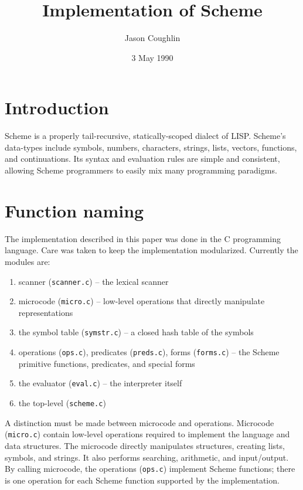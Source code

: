 
\title{Implementation of Scheme}

\author{Jason Coughlin}
\date{3 May 1990}



\maketitle

\section{Introduction}

	Scheme is a properly tail-recursive, statically-scoped dialect of
LISP.  Scheme's data-types include symbols, numbers, characters, strings,
lists, vectors, functions, and continuations.  Its syntax and evaluation
rules are simple and consistent, allowing Scheme programmers to easily mix
many programming paradigms.

\section{Function naming}

	The implementation described in this paper was done in the C
programming language.  Care was taken to keep the implementation
modularized.  Currently the modules are:

	\begin{enumerate}
	\item scanner ({\tt scanner.c}) -- the lexical scanner
	\item microcode ({\tt micro.c}) -- low-level operations that
directly manipulate representations
	\item the symbol table ({\tt symstr.c}) -- a closed hash table of
the symbols
	\item operations ({\tt ops.c}), predicates ({\tt preds.c}), forms
({\tt forms.c}) -- the Scheme primitive functions, predicates, and
special forms
	\item the evaluator ({\tt eval.c}) -- the interpreter itself
	\item the top-level ({\tt scheme.c})
	\end{enumerate}

	A distinction must be made between microcode and operations.
Microcode ({\tt micro.c}) contain low-level operations required to
implement the language and data structures.  The microcode directly
manipulates structures, creating lists, symbols, and strings.  It also
performs searching, arithmetic, and input/output.  By calling microcode,
the operations ({\tt ops.c}) implement Scheme functions; there is one
operation for each Scheme function supported by the implementation.

